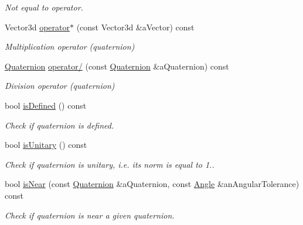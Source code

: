 \begin{DoxyCompactItemize}
\begin{DoxyCompactList}\small\item\em Not equal to operator. \end{DoxyCompactList}\item 
Vector3d \hyperlink{classlibrary_1_1math_1_1geom_1_1trf_1_1rot_1_1_quaternion_a6591efb9050f24e2b9d5c440dfeecc5f}{operator$\ast$} (const Vector3d \&a\+Vector) const
\begin{DoxyCompactList}\small\item\em Multiplication operator (quaternion) \end{DoxyCompactList}\item 
\hyperlink{classlibrary_1_1math_1_1geom_1_1trf_1_1rot_1_1_quaternion}{Quaternion} \hyperlink{classlibrary_1_1math_1_1geom_1_1trf_1_1rot_1_1_quaternion_ac0907a730ef9a96e7c06ce930e86d033}{operator/} (const \hyperlink{classlibrary_1_1math_1_1geom_1_1trf_1_1rot_1_1_quaternion}{Quaternion} \&a\+Quaternion) const
\begin{DoxyCompactList}\small\item\em Division operator (quaternion) \end{DoxyCompactList}\item 
bool \hyperlink{classlibrary_1_1math_1_1geom_1_1trf_1_1rot_1_1_quaternion_a0d74102b65b5fdb0cd92f37455cf8c66}{is\+Defined} () const
\begin{DoxyCompactList}\small\item\em Check if quaternion is defined. \end{DoxyCompactList}\item 
bool \hyperlink{classlibrary_1_1math_1_1geom_1_1trf_1_1rot_1_1_quaternion_aa5e8e0dc04aa0ac976106c823b61d911}{is\+Unitary} () const
\begin{DoxyCompactList}\small\item\em Check if quaternion is unitary, i.\+e. its norm is equal to 1.. \end{DoxyCompactList}\item 
bool \hyperlink{classlibrary_1_1math_1_1geom_1_1trf_1_1rot_1_1_quaternion_ac445a1089b34c5650ce47f2f8873d7b1}{is\+Near} (const \hyperlink{classlibrary_1_1math_1_1geom_1_1trf_1_1rot_1_1_quaternion}{Quaternion} \&a\+Quaternion, const \hyperlink{classlibrary_1_1math_1_1geom_1_1_angle}{Angle} \&an\+Angular\+Tolerance) const
\begin{DoxyCompactList}\small\item\em Check if quaternion is near a given quaternion. \end{DoxyCompactList}\item 

\end{DoxyCompactItemize}
